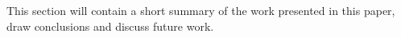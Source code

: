 

This section will contain a short summary of the work presented in this paper, draw conclusions and discuss future work.

